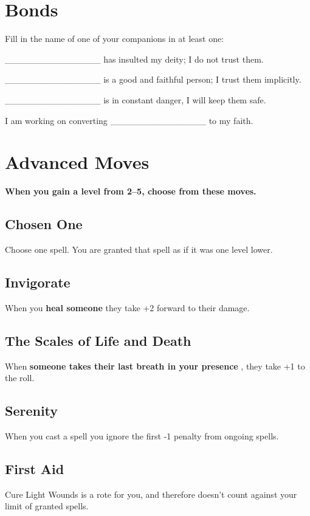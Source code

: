 \section*{Bonds}

Fill in the name of one of your companions in at least one:

\_\_\_\_\_\_\_\_\_\_\_\_\_\_\_ has insulted my deity; I do not trust them.

\_\_\_\_\_\_\_\_\_\_\_\_\_\_\_ is a good and faithful person; I trust them implicitly.

\_\_\_\_\_\_\_\_\_\_\_\_\_\_\_ is in constant danger, I will keep them safe.

I am working on converting \_\_\_\_\_\_\_\_\_\_\_\_\_\_\_ to my faith.
\section*{Advanced Moves}

{\bfseries When you gain a level from 2--5, choose from these moves.}
\subsection{Chosen One}

Choose one spell. You are granted that spell as if it was one level lower.
\subsection{Invigorate}

When you \textbf{heal someone}
they take +2 forward to their damage.
\subsection{The Scales of Life and Death}

When \textbf{someone takes their last breath in your presence}
, they take +1 to the roll.
\subsection{Serenity}

When you cast a spell you ignore the first -1 penalty from ongoing spells.
\subsection{First Aid}

Cure Light Wounds is a rote for you, and therefore doesn't count against your limit of granted spells.
